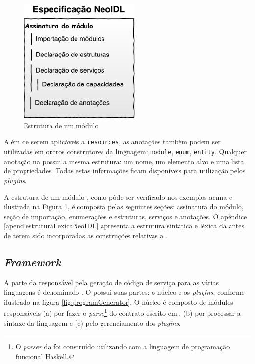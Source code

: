 \begin{figure}[htb]
\begin{center}
\includegraphics[width=60mm,trim=0cm 0cm 0cm
0cm]{img/NeoIDLModuleSpecificationPt.pdf}
\end{center}
\caption{Estrutura de um módulo \neoidl{}}
\label{fig:moduloNeoIDL}
\end{figure}

Além de serem aplicáveis a \texttt{resources}, as anotações também podem ser
utilizadas em outros construtores da linguagem: \texttt{module},
\texttt{enum}, \texttt{entity}. Qualquer anotação na \neoidl{} possui a mesma estrutura: um
nome, um elemento alvo e uma lista de propriedades. Todas estas informações
ficam disponíveis para utilização pelos \textit{plugins}.


A estrutura de um módulo \neoidl{}, como pôde ser verificado nos exemplos
acima e ilustrada na Figura \ref{fig:moduloNeoIDL}, é composta pelas seguintes
seções: assinatura do módulo, seção de importação, enumerações e estruturas,
serviços e anotações. O apêndice \ref{apend:estruturaLexicaNeoIDL} apresenta a
estrutura sintática e léxica da \neoidl{} antes de terem sido incorporadas as construções
relativas a \designbycontract{}.



\subsection{\textit{Framework}}
\label{frameNeoIDL}
\vspace{-6mm}

A parte da \neoidl{} responsável pela geração de código de
serviço para as várias linguagens é denominado \framework{} \neoidl{}. O
\framework{} \neoidl{} possui suas partes: o núcleo e os \textit{plugins},
conforme ilustrado na figura \ref{fig:programGenerator}.
O núcleo é composto de módulos responsáveis (a) por fazer o \textit{parse}\footnote{O \textit{parser} da \neoidl{}
foi construído utilizando \bnfc{} \cite{ranta-bnfc:2012} com a linguagem de
programação funcional Haskell.}
do contrato escrito em \neoidl{}, (b) por processar a sintaxe da linguagem \neoidl{} e (c) pelo gerenciamento dos \textit{plugins}.

